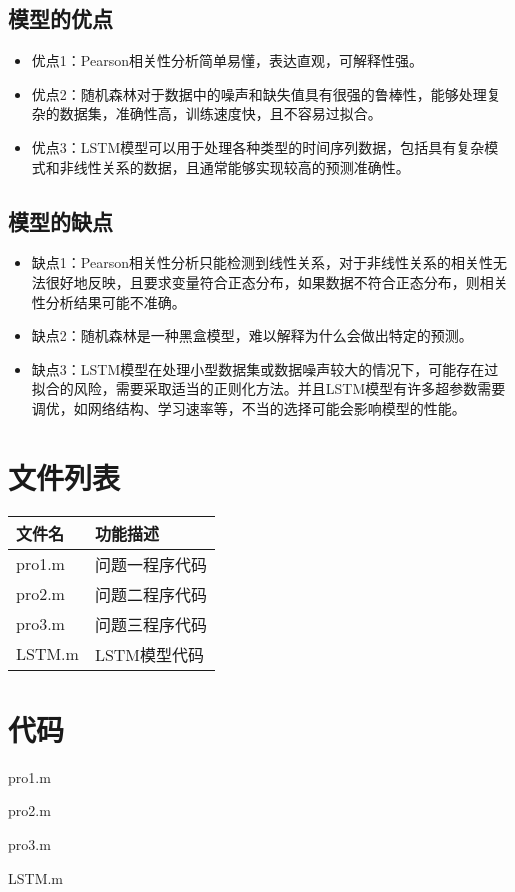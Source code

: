 \documentclass[withoutpreface,bwprint]{cumcmthesis}
\begin{document}
\subsection{模型的优点}
\begin{itemize}[itemindent=2em]
\item 优点1：Pearson相关性分析简单易懂，表达直观，可解释性强。
\item 优点2：随机森林对于数据中的噪声和缺失值具有很强的鲁棒性，能够处理复杂的数据集，准确性高，训练速度快，且不容易过拟合。
\item 优点3：LSTM模型可以用于处理各种类型的时间序列数据，包括具有复杂模式和非线性关系的数据，且通常能够实现较高的预测准确性。
\end{itemize}

\subsection{模型的缺点}
\begin{itemize}[itemindent=2em]
\item 缺点1：Pearson相关性分析只能检测到线性关系，对于非线性关系的相关性无法很好地反映，且要求变量符合正态分布，如果数据不符合正态分布，则相关性分析结果可能不准确。
\item 缺点2：随机森林是一种黑盒模型，难以解释为什么会做出特定的预测。
\item 缺点3：LSTM模型在处理小型数据集或数据噪声较大的情况下，可能存在过拟合的风险，需要采取适当的正则化方法。并且LSTM模型有许多超参数需要调优，如网络结构、学习速率等，不当的选择可能会影响模型的性能。
\end{itemize}

\newpage
\nocite{*}

\newpage
\begin{appendices}
\section{文件列表}
\begin{table}[H]
\centering
\begin{tabularx}{\textwidth}{LL}
\toprule
文件名   & 功能描述 \\
\midrule
pro1.m & 问题一程序代码 \\
pro2.m & 问题二程序代码 \\
pro3.m & 问题三程序代码 \\
LSTM.m & LSTM模型代码 \\
\bottomrule
\end{tabularx}
\label{tab:文件列表}
\end{table}

\section{代码}
\noindent pro1.m

pro2.m

pro3.m

LSTM.m

\end{appendices}
\end{document}
